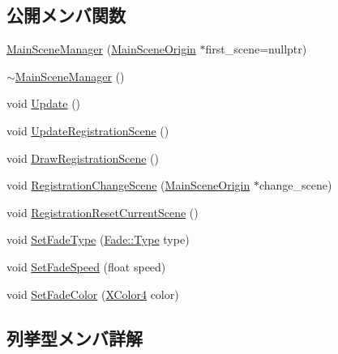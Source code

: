 \subsection*{公開メンバ関数}
\begin{DoxyCompactItemize}
\item 
\mbox{\hyperlink{class_main_scene_manager_a072e115cf03a45c150d295bec09d27de}{Main\+Scene\+Manager}} (\mbox{\hyperlink{class_main_scene_origin}{Main\+Scene\+Origin}} $\ast$first\+\_\+scene=nullptr)
\item 
\mbox{\hyperlink{class_main_scene_manager_a5411d96b5ff80847fe45547b61c842dc}{$\sim$\+Main\+Scene\+Manager}} ()
\item 
void \mbox{\hyperlink{class_main_scene_manager_a07a720b6bb727df98ce6d87c9b1cbb5b}{Update}} ()
\item 
void \mbox{\hyperlink{class_main_scene_manager_a39d8cbebf57b927510f7af4b2c75c25a}{Update\+Registration\+Scene}} ()
\item 
void \mbox{\hyperlink{class_main_scene_manager_ae74ade9e9b60dd29f36d67918268d073}{Draw\+Registration\+Scene}} ()
\item 
void \mbox{\hyperlink{class_main_scene_manager_af73dc8b4d1e153ec2b27e2b133e5f599}{Registration\+Change\+Scene}} (\mbox{\hyperlink{class_main_scene_origin}{Main\+Scene\+Origin}} $\ast$change\+\_\+scene)
\item 
void \mbox{\hyperlink{class_main_scene_manager_a40e3ea4d41259a9bdcdf0622d65430c0}{Registration\+Reset\+Current\+Scene}} ()
\item 
void \mbox{\hyperlink{class_main_scene_manager_a0bc7484976a4ccd3a316dbcb8f65f133}{Set\+Fade\+Type}} (\mbox{\hyperlink{class_fade_ac06f27215b454aa05b93c236476d6e80}{Fade\+::\+Type}} type)
\item 
void \mbox{\hyperlink{class_main_scene_manager_acc3cb332f6d2ab7606a3a02aaf1a31a5}{Set\+Fade\+Speed}} (float speed)
\item 
void \mbox{\hyperlink{class_main_scene_manager_aec20589b9410c2a63470e13f3d45e6cb}{Set\+Fade\+Color}} (\mbox{\hyperlink{_vector3_d_8h_a680c30c4a07d86fe763c7e01169cd6cc}{X\+Color4}} color)
\end{DoxyCompactItemize}


\subsection{列挙型メンバ詳解}
\mbox{\label{class_main_scene_manager_aa66c4c2962514285b245950817a3640c}} 
